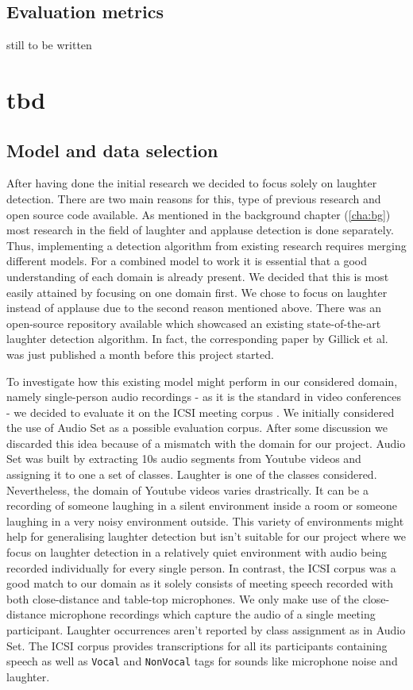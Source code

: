 \documentclass[bsc,frontabs,parskip,deptreport]{infthesis}
\begin{document}
\section{Evaluation metrics} \label{theory}
still to be written


\chapter{tbd} 

\section{Model and data selection}\label{sec:model-and-data}
After having done the initial research we decided to focus solely on laughter detection. 
There are two main reasons for this, type of previous research and open source code available.  
As mentioned in the background chapter (\ref{cha:bg}) most research in the field of laughter and applause detection is done separately. 
Thus, implementing a detection algorithm from existing research requires merging different models. 
For a combined model to work it is essential that a good understanding of each domain is already present.
We decided that this is most easily attained by focusing on one domain first. 
We chose to focus on laughter instead of applause due to the second reason mentioned above.
There was an open-source repository available which showcased an existing state-of-the-art laughter detection algorithm.
In fact, the corresponding paper by Gillick et al. \cite{gillick2021robust} was just published a month before this project started.


To investigate how this existing model might perform in our considered domain, namely single-person audio recordings - as it is the standard in video conferences - we decided to evaluate it on the ICSI meeting corpus \cite{morgan2001meeting}. 
We initially considered the use of Audio Set \cite{googleaudioset} as a possible evaluation corpus. After some discussion we discarded this idea because of a mismatch with the domain for our project. Audio Set was built by extracting 10s audio segments from Youtube videos and assigning it to one a set of classes. Laughter is one of the classes considered. Nevertheless, the domain of Youtube videos varies drastrically. It can be a recording of someone laughing in a silent environment inside a room or someone laughing in a very noisy environment outside. This variety of environments might help for generalising laughter detection but isn't suitable for our project where we focus on laughter detection in a relatively quiet environment with audio being recorded individually for every single person.
In contrast, the ICSI corpus was a good match to our domain as it solely consists of meeting speech recorded with both close-distance and table-top microphones. 
We only make use of the close-distance microphone recordings which capture the audio of a single meeting participant.
Laughter occurrences aren't reported by class assignment as in Audio Set. The ICSI corpus provides transcriptions for all its participants containing speech as well as \texttt{Vocal} and \texttt{NonVocal} tags for sounds like microphone noise and laughter. 
\end{document}
